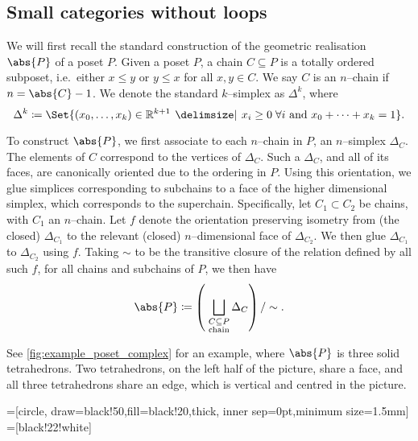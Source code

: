 \subsection{Small categories without loops}

We will first recall the standard construction of the geometric realisation $\abs{P}$ of a poset $P$.
Given a poset $P$, a chain $C \subseteq P$ is a totally ordered subposet, i.e.~either $x \leq y$ or  $y \leq x$ for all  $x,y \in C$.
We say $C$ is an $n$--chain if $n=\abs{C}-1$.
We denote the standard $k$--simplex as $\Delta^k$, where
\[
	\Delta^k \coloneq \Set{(x_0,\ldots, x_k) \in \R^{k+1} \given x_i \geq 0 \; \forall i \text{ and } x_0 + \cdots + x_k =1}
	.\]

To construct $\abs{P}$, we first associate to each $n$--chain in $P$, an $n$--simplex $\Delta_{C}$.
The elements of $C$ correspond to the vertices of $\Delta_{C}$.
Such a $\Delta_C$, and all of its faces, are canonically oriented due to the ordering in $P$.
Using this orientation, we glue simplices corresponding to subchains to a face of the higher dimensional simplex, which corresponds to the superchain.
Specifically, let $C_1 \subset C_2$ be chains, with $C_1$ an $n$--chain.
Let $f$ denote the orientation preserving isometry from (the closed) $\Delta_{C_1}$ to the relevant (closed) $n$--dimensional face of $\Delta_{C_2}$.
We then glue $\Delta_{C_1}$ to $\Delta_{C_2}$ using  $f$.
Taking $\sim$ to be the transitive closure of the relation defined by all such $f$, for all chains and subchains of  $P$, we then have
\[
	\abs{P} \coloneq \left(\;\bigsqcup_{\substack{ C \subseteq P \\ \text{chain}}} \Delta_C \right)/\sim
	.\]

See \cref{fig:example_poset_complex} for an example, where $\abs{P}$ is three solid tetrahedrons.
Two tetrahedrons, on the left half of the picture, share a face, and all three tetrahedrons share an edge, which is vertical and centred in the picture.

=[circle, draw=black!50,fill=black!20,thick, inner sep=0pt,minimum size=1.5mm]
=[black!22!white]

